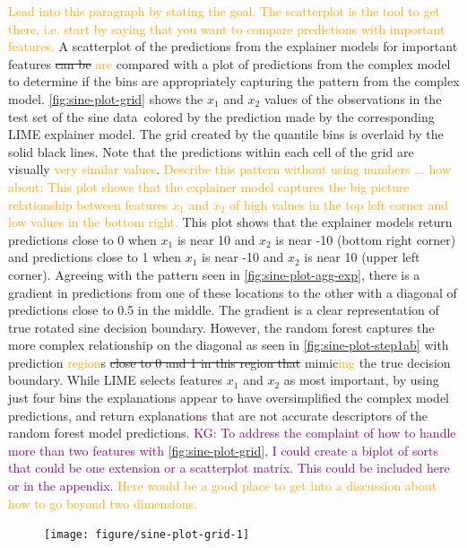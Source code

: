\documentclass[AMS,STIX2COL]{WileyNJD-v2}\usepackage[]{graphicx}\usepackage[]{color}
\newenvironment{knitrout}{}{} %
\newcommand{\hh}[1]{\textcolor{orange}{#1}}
\newcommand{\kgc}[1]{\textcolor{purple}{#1}}
\newcommand{\data}{sine data}
\begin{document}
{\hh{Lead into this paragraph by stating the goal. The scatterplot is the tool to get there, i.e. start by saying that you want to compare predictions with important features.}
A scatterplot of the predictions from the explainer models for important features \sout{can be} \hh{are} compared with a plot of predictions from the complex model to determine if the bins are appropriately capturing the pattern from the complex model.
\autoref{fig:sine-plot-grid} shows the $x_1$ and $x_2$ values of the observations in the test set of the \data \ colored by the prediction made by the corresponding LIME explainer model. The grid created by the quantile bins is overlaid by the solid black lines. Note that the predictions within each cell of the grid are visually \hh{very similar values}. \hh{Describe this pattern without using numbers ... how about: This plot shows that the explainer model captures the big picture relationship between features $x_1$ and $x_2$ of high values in the top left corner and low values in the bottom right. } This plot shows that the explainer models return predictions close to 0 when $x_1$ is near 10 and $x_2$ is near -10 (bottom right corner) and predictions close to 1 when $x_1$ is near -10 and $x_2$ is near 10 (upper left corner). Agreeing with the pattern seen in \autoref{fig:sine-plot-agg-exp}, there is a gradient in predictions from one of these locations to the other with a diagonal of predictions close to 0.5 in the middle. The gradient is a clear representation of true rotated sine decision boundary. However, the random forest captures the more complex relationship on the diagonal as seen in \autoref{fig:sine-plot-step1ab} with prediction \hh{region}s \sout{close to 0 and 1 in this region that} mimic\hh{ing} the true decision boundary. While LIME selects features  $x_1$ and $x_2$ as most important, by using just four  bins the explanations appear to have oversimplified the complex model predictions, and return explanations that are not accurate descriptors of the random forest model predictions. \kgc{KG: To address the complaint of how to handle more than two features with \autoref{fig:sine-plot-grid}, I could create a biplot of sorts that could be one extension or a scatterplot matrix. This could be included here or in the appendix.}
\hh{Here would be a good place to get into a discussion about how to go beyond two dimensions. }

\begin{figure}[!t]
\begin{knitrout}
\color{fgcolor}
\texttt{[image: figure/sine-plot-grid-1]} 


\end{knitrout}
\end{figure}}
\end{document}
